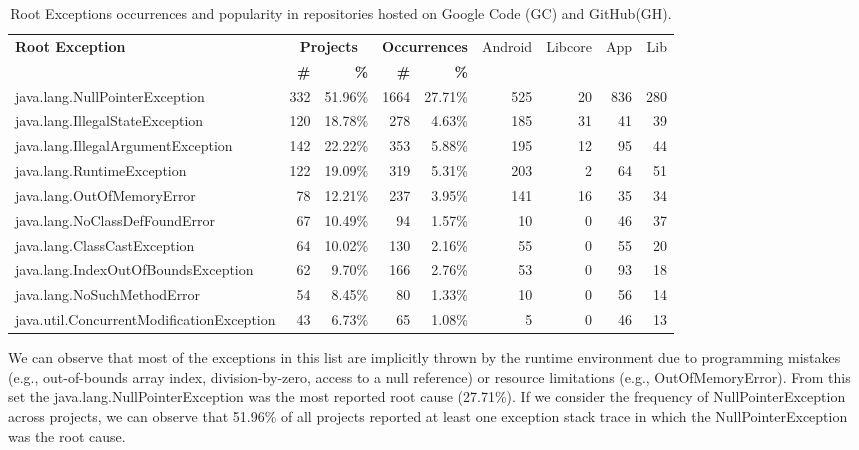 \begin{table}
  \tiny
  \centering
  \begin{tabular}{lrrrrrrrr}
    \hline
    \bfseries{Root Exception} &  \multicolumn{2}{c}{\bfseries{Projects}} &  \multicolumn{2}{c}{\bfseries{Occurrences}} & \textsf{Android} & \textsf{Libcore} & \textsf{App} & \textsf{Lib} \\
    & \bfseries{\#} &  \bfseries{\%} & \bfseries{\# } & \bfseries{\% } &&&&\\
    \hline

java.lang.NullPointerException	&	332	&	51.96\%	&	1664	&	27.71\%	&	525	&	20	&	836	&	280	\\
java.lang.IllegalStateException	&	120	&	18.78\%	&	278	&	4.63\%	&	185	&	31	&	41	&	39	\\
java.lang.IllegalArgumentException	&	142	&	22.22\%	&	353	&	5.88\%	&	195	&	12	&	95	&	44	\\
java.lang.RuntimeException	&	122	&	19.09\%	&	319	&	5.31\%	&	203	&	2	&	64	&	51	\\
java.lang.OutOfMemoryError	&	78	&	12.21\%	&	237	&	3.95\%	&	141	&	16	&	35	&	34	\\
java.lang.NoClassDefFoundError	&	67	&	10.49\%	&	94	&	1.57\%	&	10	&	0	&	46	&	37	\\
java.lang.ClassCastException	&	64	&	10.02\%	&	130	&	2.16\%	&	55	&	0	&	55	&	20	\\
java.lang.IndexOutOfBoundsException	&	62	&	9.70\%	&	166	&	2.76\%	&	53	&	0	&	93	&	18	\\
java.lang.NoSuchMethodError	&	54	&	8.45\%	&	80	&	1.33\%	&	10	&	0	&	56	&	14	\\
java.util.ConcurrentModificationException	&	43	&	6.73\%	&	65	&	1.08\%	&	5	&	0	&	46	&	13	\\
    \hline
  \end{tabular}
\caption{Root Exceptions occurrences and popularity in repositories hosted on Google Code (GC) and GitHub(GH).}
\label{tab:topten}
\end{table}
 
We can observe that most of the exceptions in this list are implicitly thrown by the
 runtime environment due to programming mistakes  (e.g., out-of-bounds array index, division-by-zero, access to a null reference)
 or resource limitations (e.g., OutOfMemoryError). 
From this set the java.lang.NullPointerException was the most reported root cause (27.71\%). 
If we consider the frequency of NullPointerException 
across projects, we can observe that 51.96\% of all projects reported at least one exception stack 
trace in which the NullPointerException was the root cause.

